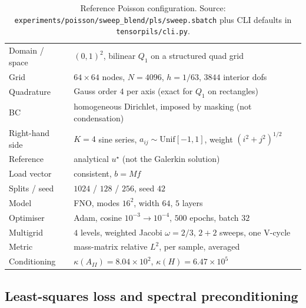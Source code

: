 \documentclass[11pt]{article}
\begin{document}
\begin{table}[H]
  \centering
  \begin{tabular}{ll}
    \hline
    Domain / space & $(0,1)^2$, bilinear $Q_1$ on a structured quad grid \\
    Grid & $64\times 64$ nodes, $N=4096$, $h=1/63$, $3844$ interior dofs \\
    Quadrature & Gauss order $4$ per axis (exact for $Q_1$ on rectangles) \\
    BC & homogeneous Dirichlet, imposed by masking (not condensation) \\
    Right-hand side & $K=4$ sine series, $a_{ij}\sim\mathrm{Unif}[-1,1]$, weight $(i^2+j^2)^{1/2}$ \\
    Reference & analytical $u^\star$ (not the Galerkin solution) \\
    Load vector & consistent, $b = Mf$ \\
    Splits / seed & $1024$ / $128$ / $256$, seed $42$ \\
    Model & FNO, modes $16^2$, width $64$, $5$ layers \\
    Optimiser & Adam, cosine $10^{-3}\!\to\!10^{-4}$, $500$ epochs, batch $32$ \\
    Multigrid & $4$ levels, weighted Jacobi $\omega=2/3$, $2{+}2$ sweeps, one V-cycle \\
    Metric & mass-matrix relative $L^2$, per sample, averaged \\
    Conditioning & $\kappa(A_{II}) = 8.04\times10^{2}$, $\kappa(H) = 6.47\times10^{5}$ \\
    \hline
  \end{tabular}
  \caption{Reference Poisson configuration. Source:
  \texttt{experiments/poisson/sweep\_blend/pls/sweep.sbatch} plus CLI defaults in
  \texttt{tensorpils/cli.py}.}
  \label{tab:poisson-setup}
\end{table}

\subsection{Least-squares loss and spectral preconditioning}
\end{document}
